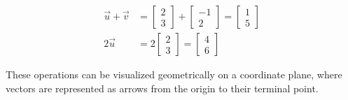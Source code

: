 \documentclass{article}
\begin{document}
\begin{align*}
\vec{u} + \vec{v} &= \begin{bmatrix} 2 \\ 3 \end{bmatrix} + \begin{bmatrix} -1 \\ 2 \end{bmatrix} = \begin{bmatrix} 1 \\ 5 \end{bmatrix} \\
2\vec{u} &= 2\begin{bmatrix} 2 \\ 3 \end{bmatrix} = \begin{bmatrix} 4 \\ 6 \end{bmatrix}
\end{align*}

These operations can be visualized geometrically on a coordinate plane, where vectors are represented as arrows from the origin to their terminal point.
\end{document}
